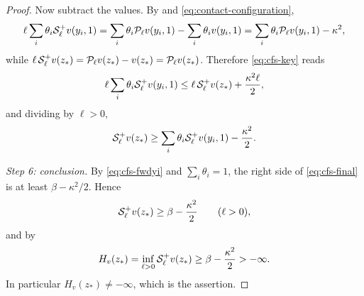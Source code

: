 \begin{proof}
Now subtract the values. By  and
\eqref{eq:contact-configuration},
\[
  \ell\sum_i\theta_i\mathcal{S}_\ell^+v(y_i,1)
   =\sum_i\theta_i\mathcal{P}_\ell v(y_i,1)-\sum_i\theta_iv(y_i,1)
   =\sum_i\theta_i\mathcal{P}_\ell v(y_i,1)-\kappa^2 ,
\]
while $\ell\,\mathcal{S}_\ell^+v(z_*)=\mathcal{P}_\ell v(z_*)-v(z_*)=\mathcal{P}_\ell v(z_*)$.
Therefore \eqref{eq:cfs-key} reads
\[
  \ell\sum_i\theta_i\mathcal{S}_\ell^+v(y_i,1)
   \le\ell\,\mathcal{S}_\ell^+v(z_*)+\frac{\kappa^2\ell}{2},
\]
and dividing by $\ell>0$,
\begin{equation}\label{eq:cfs-final}
  \mathcal{S}_\ell^+v(z_*)\ge\sum_i\theta_i\mathcal{S}_\ell^+v(y_i,1)-\frac{\kappa^2}{2}.
\end{equation}

\emph{Step 6: conclusion.}
By \eqref{eq:cfs-fwdyi} and $\sum_i\theta_i=1$, the right side of
\eqref{eq:cfs-final} is at least $\beta-\kappa^2/2$. Hence
\[
  \mathcal{S}_\ell^+v(z_*)\ge\beta-\frac{\kappa^2}{2}\qquad(\ell>0),
\]
and by 
\[
  H_v(z_*)=\inf_{\ell>0}\mathcal{S}_\ell^+v(z_*)\ge\beta-\frac{\kappa^2}{2}>-\infty .
\]
In particular $H_v(z_*)\ne-\infty$, which is the assertion.
\end{proof}
